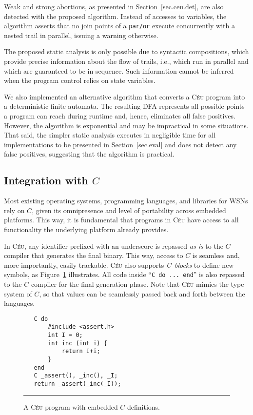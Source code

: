 \documentclass[10pt]{sensys-proc}
\newcommand{\CEU}{\textsc{C\'{e}u}\xspace}
\newcommand{\code}[1] {{\small{\texttt{#1}}}}
\begin{document}
Weak and strong abortions, as presented in Section~\ref{sec.ceu.det}, are also 
detected with the proposed algorithm.
Instead of accesses to variables, the algorithm asserts that no join points of 
a \code{par/or} execute concurrently with a nested trail in parallel, issuing a 
warning otherwise.

The proposed static analysis is only possible due to syntactic compositions, 
which provide precise information about the flow of trails, i.e., which run in 
parallel and which are guaranteed to be in sequence.
Such information cannot be inferred when the program control relies on state 
variables.

We also implemented an alternative algorithm that converts a \CEU program into 
a deterministic finite automata.
The resulting DFA represents all possible points a program can reach during 
runtime and, hence, eliminates all false positives.
However, the algorithm is exponential and may be impractical in some 
situations.
%
That said, the simpler static analysis executes in negligible time for all 
implementations to be presented in Section~\ref{sec.eval} and does not detect 
any false positives, suggesting that the algorithm is practical.

\subsection{Integration with $C$}
\label{sec.ceu.c}

Most existing operating systems, programming languages, and libraries for WSNs 
rely on $C$, given its omnipresence and level of portability across embedded 
platforms.
This way, it is fundamental that programs in \CEU have access to all 
functionality the underlying platform already provides.

In \CEU, any identifier prefixed with an underscore is repassed \emph{as is} to 
the $C$ compiler that generates the final binary.
This way, access to $C$ is seamless and, more importantly, easily trackable.
%
\CEU also supports \emph{C~blocks} to define new symbols, as Figure~\ref{lst.c} 
illustrates.
All code inside ``\code{C do ... end}'' is also repassed to the $C$ compiler 
for the final generation phase.
Note that \CEU{} mimics the type system of $C$, so that values can be 
seamlessly passed back and forth between the languages.

\begin{figure}[t]
{\small
\begin{verbatim}
   C do
       #include <assert.h>
       int I = 0;
       int inc (int i) {
           return I+i;
       }
   end
   C _assert(), _inc(), _I;
   return _assert(_inc(_I));
\end{verbatim}
}
\rule{8.5cm}{0.37pt}
\caption{ A \CEU program with embedded $C$ definitions.
\label{lst.c}
}
\end{figure}
\end{document}
